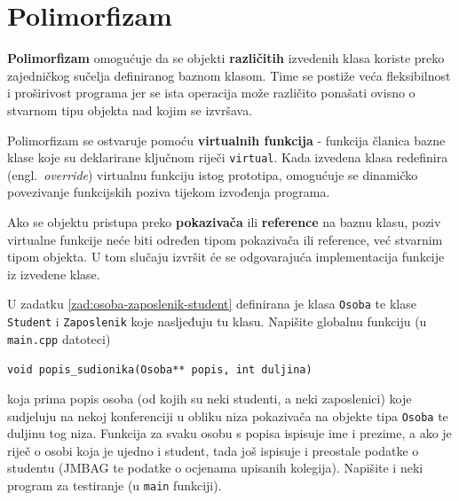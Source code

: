 \section{Polimorfizam}


\textbf{Polimorfizam} omogućuje da se objekti \textbf{različitih} izvedenih klasa koriste preko zajedničkog sučelja definiranog baznom klasom. 
Time se postiže veća fleksibilnost i proširivost programa jer se ista operacija može različito ponašati ovisno o stvarnom tipu objekta nad kojim se izvršava.
\medskip

Polimorfizam se ostvaruje pomoću \textbf{virtualnih funkcija}
- funkcija članica bazne klase koje su deklarirane ključnom riječi 
\texttt{virtual}. 
Kada izvedena klasa redefinira (engl.\ \textit{override}) virtualnu funkciju istog prototipa, 
omogućuje se dinamičko povezivanje funkcijskih poziva tijekom izvođenja programa.
\medskip 

Ako se objektu pristupa preko \textbf{pokazivača} ili \textbf{reference} na baznu klasu, 
poziv virtualne funkcije neće biti određen tipom pokazivača ili reference, već stvarnim tipom objekta. 
U tom slučaju izvršit će se odgovarajuća implementacija funkcije iz izvedene klase.
\medskip

\begin{zadatak}
    U zadatku \ref{zad:osoba-zaposlenik-student} definirana je klasa \texttt{Osoba}
    te klase \texttt{Student} i \texttt{Zaposlenik}
    koje nasljeđuju tu klasu.
    Napišite globalnu funkciju (u \texttt{main.cpp} datoteci)
    \begin{center}
        \texttt{void popis\_sudionika(Osoba** popis, int duljina)}
    \end{center}
    koja prima popis osoba
    (od kojih su neki studenti, a neki zaposlenici)
    koje sudjeluju na nekoj konferenciji u obliku niza pokazivača na objekte tipa \texttt{Osoba}
    te duljinu tog niza.
    Funkcija za svaku osobu s popisa ispisuje ime i prezime, a ako je riječ o osobi koja je ujedno i student,
    tada još ispisuje i preostale podatke o studentu 
    (JMBAG te podatke o ocjenama upisanih kolegija).
    Napišite i neki program za testiranje (u \texttt{main} funkciji).
\end{zadatak}


